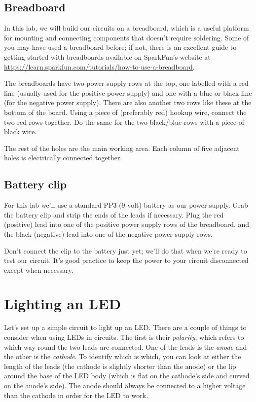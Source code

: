 \documentclass{article}
\begin{document}
\subsection{Breadboard}

In this lab, we will build our circuits on a breadboard, which is a useful
platform for mounting and connecting components that doesn't require soldering.
Some of you may have used a breadboard before; if not, there is an excellent
guide to getting started with breadboards available on SparkFun's website at
\url{https://learn.sparkfun.com/tutorials/how-to-use-a-breadboard}.

The breadboards have two power supply rows at the top, one labelled with
a red line (usually used for the positive power supply) and one with a blue or
black line (for the negative power supply). There are also another two
rows like these at the bottom of the board. Using a piece of (preferably red)
hookup wire, connect the two red rows together. Do the same for the two
black/blue rows with a piece of black wire.

The rest of the holes are the main working area. Each column of five adjacent
holes is electrically connected together.

\subsection{Battery clip}

For this lab we'll use a standard PP3 (9 volt) battery as our power supply.
Grab the battery clip and strip the ends of the leads if necessary. Plug the
red (positive) lead into one of the positive power supply rows of the
breadboard, and the black (negative) lead into one of the negative power supply
rows.

Don't connect the clip to the battery just yet; we'll do that when we're ready
to test our circuit. It's good practice to keep the power to your circuit
disconnected except when necessary.

\section{Lighting an LED}

Let's set up a simple circuit to light up an LED. There are a couple of things
to consider when using LEDs in circuits. The first is their \emph{polarity},
which refers to which way round the two leads are connected. One of the leads
is the \emph{anode} and the other is the \emph{cathode}. To identify which is
which, you can look at either the length of the leads (the cathode is slightly
shorter than the anode) or the lip around the base of the LED body (which is
flat on the cathode's side and curved on the anode's side). The anode should
always be connected to a higher voltage than the cathode in order for the LED
to work.
\end{document}
